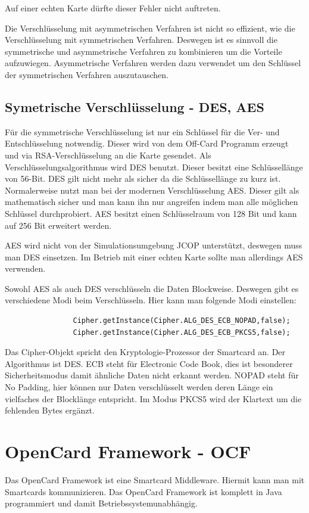 \documentclass[parskip]{scrartcl}
\begin{document}
			Auf einer echten Karte dürfte dieser Fehler nicht auftreten.
		
			Die Verschlüsselung mit asymmetrischen Verfahren ist nicht so effizient, wie die Verschlüsselung mit symmetrischen Verfahren. Deswegen ist es sinnvoll die symmetrische und asymmetrische Verfahren zu kombinieren um die Vorteile aufzuwiegen. Asymmetrische Verfahren werden dazu verwendet um den Schlüssel der symmetrischen Verfahren auszutauschen.
	
		\subsection{Symetrische Verschlüsselung - DES, AES}
			Für die symmetrische Verschlüsselung ist nur ein Schlüssel für die Ver- und Entschlüs\-selung notwendig. Dieser wird von dem Off-Card Programm erzeugt und via RSA-Verschlüs\-selung an die Karte gesendet. Als Verschlüsselungsalgorithmus wird DES benutzt. Dieser besitzt eine Schlüssellänge von 56-Bit. DES gilt nicht mehr als sicher da die Schlüssellänge zu kurz ist. Normalerweise nutzt man bei der modernen Verschlüsselung AES. Dieser gilt als mathematisch sicher und man kann ihn nur angreifen indem man alle möglichen Schlüssel durchprobiert. AES besitzt einen Schlüsselraum von 128 Bit und kann auf 256 Bit erweitert werden.
			
			AES wird nicht von der Simulationsumgebung JCOP unterstützt, deswegen muss man DES einsetzen. Im Betrieb mit einer echten Karte sollte man allerdings AES verwenden.
			
			Sowohl AES als auch DES verschlüsseln die Daten Blockweise. Deswegen gibt es verschiedene Modi beim Verschlüsseln. Hier kann man folgende Modi einstellen:
			
			\begin{lstlisting}
				Cipher.getInstance(Cipher.ALG_DES_ECB_NOPAD,false);
				Cipher.getInstance(Cipher.ALG_DES_ECB_PKCS5,false);
			\end{lstlisting}
			
			Das Cipher-Objekt spricht den Kryptologie-Prozessor der Smartcard an. Der Algorithmus ist DES. ECB steht für Electronic Code Book, dies ist besonderer Sicherheitsmodus damit ähnliche Daten nicht erkannt werden. NOPAD steht für No Padding, hier können nur Daten verschlüsselt werden deren Länge ein vielfaches der Blocklänge entspricht. Im Modus PKCS5 wird der Klartext um die fehlenden Bytes ergänzt.
				
	\section{OpenCard Framework - OCF}
		Das OpenCard Framework ist eine Smartcard Middleware. Hiermit kann man mit Smartcards kommunizieren. Das OpenCard Framework ist komplett in Java programmiert und damit Betriebssystemunabhängig.
		
\end{document}
